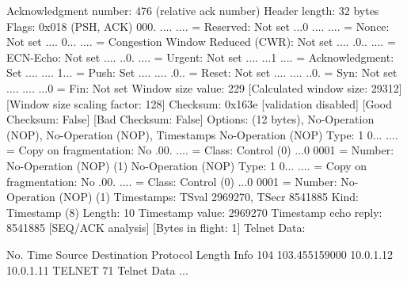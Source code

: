     Acknowledgment number: 476    (relative ack number)
    Header length: 32 bytes
    Flags: 0x018 (PSH, ACK)
        000. .... .... = Reserved: Not set
        ...0 .... .... = Nonce: Not set
        .... 0... .... = Congestion Window Reduced (CWR): Not set
        .... .0.. .... = ECN-Echo: Not set
        .... ..0. .... = Urgent: Not set
        .... ...1 .... = Acknowledgment: Set
        .... .... 1... = Push: Set
        .... .... .0.. = Reset: Not set
        .... .... ..0. = Syn: Not set
        .... .... ...0 = Fin: Not set
    Window size value: 229
    [Calculated window size: 29312]
    [Window size scaling factor: 128]
    Checksum: 0x163e [validation disabled]
        [Good Checksum: False]
        [Bad Checksum: False]
    Options: (12 bytes), No-Operation (NOP), No-Operation (NOP), Timestamps
        No-Operation (NOP)
            Type: 1
                0... .... = Copy on fragmentation: No
                .00. .... = Class: Control (0)
                ...0 0001 = Number: No-Operation (NOP) (1)
        No-Operation (NOP)
            Type: 1
                0... .... = Copy on fragmentation: No
                .00. .... = Class: Control (0)
                ...0 0001 = Number: No-Operation (NOP) (1)
        Timestamps: TSval 2969270, TSecr 8541885
            Kind: Timestamp (8)
            Length: 10
            Timestamp value: 2969270
            Timestamp echo reply: 8541885
    [SEQ/ACK analysis]
        [Bytes in flight: 1]
Telnet
    Data: 

No.     Time           Source                Destination           Protocol Length Info
    104 103.455159000  10.0.1.12             10.0.1.11             TELNET   71     Telnet Data ...

